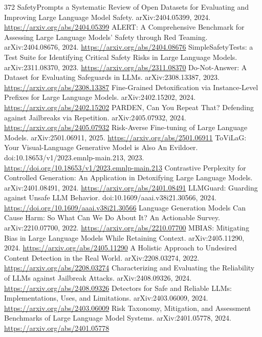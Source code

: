 \documentclass[11pt]{article}
\begin{document}
\begin{thebibliography}{372}
 SafetyPrompts a Systematic Review of Open Datasets for Evaluating and Improving Large Language Model Safety. arXiv:2404.05399, 2024. \url{https://arxiv.org/abs/2404.05399}
 ALERT: A Comprehensive Benchmark for Assessing Large Language Models' Safety through Red Teaming. arXiv:2404.08676, 2024. \url{https://arxiv.org/abs/2404.08676}
 SimpleSafetyTests: a Test Suite for Identifying Critical Safety Risks in Large Language Models. arXiv:2311.08370, 2023. \url{https://arxiv.org/abs/2311.08370}
 Do-Not-Answer: A Dataset for Evaluating Safeguards in LLMs. arXiv:2308.13387, 2023. \url{https://arxiv.org/abs/2308.13387}
 Fine-Grained Detoxification via Instance-Level Prefixes for Large Language Models. arXiv:2402.15202, 2024. \url{https://arxiv.org/abs/2402.15202}
 PARDEN, Can You Repeat That? Defending against Jailbreaks via Repetition. arXiv:2405.07932, 2024. \url{https://arxiv.org/abs/2405.07932}
 Risk-Averse Fine-tuning of Large Language Models. arXiv:2501.06911, 2025. \url{https://arxiv.org/abs/2501.06911}
 ToViLaG: Your Visual-Language Generative Model is Also An Evildoer. doi:10.18653/v1/2023.emnlp-main.213, 2023. \url{https://doi.org/10.18653/v1/2023.emnlp-main.213}
 Contrastive Perplexity for Controlled Generation: An Application in Detoxifying Large Language Models. arXiv:2401.08491, 2024. \url{https://arxiv.org/abs/2401.08491}
 LLMGuard: Guarding against Unsafe LLM Behavior. doi:10.1609/aaai.v38i21.30566, 2024. \url{https://doi.org/10.1609/aaai.v38i21.30566}
 Language Generation Models Can Cause Harm: So What Can We Do About It? An Actionable Survey. arXiv:2210.07700, 2022. \url{https://arxiv.org/abs/2210.07700}
 MBIAS: Mitigating Bias in Large Language Models While Retaining Context. arXiv:2405.11290, 2024. \url{https://arxiv.org/abs/2405.11290}
 A Holistic Approach to Undesired Content Detection in the Real World. arXiv:2208.03274, 2022. \url{https://arxiv.org/abs/2208.03274}
 Characterizing and Evaluating the Reliability of LLMs against Jailbreak Attacks. arXiv:2408.09326, 2024. \url{https://arxiv.org/abs/2408.09326}
 Detectors for Safe and Reliable LLMs: Implementations, Uses, and Limitations. arXiv:2403.06009, 2024. \url{https://arxiv.org/abs/2403.06009}
 Risk Taxonomy, Mitigation, and Assessment Benchmarks of Large Language Model Systems. arXiv:2401.05778, 2024. \url{https://arxiv.org/abs/2401.05778}

\end{thebibliography}
\end{document}
